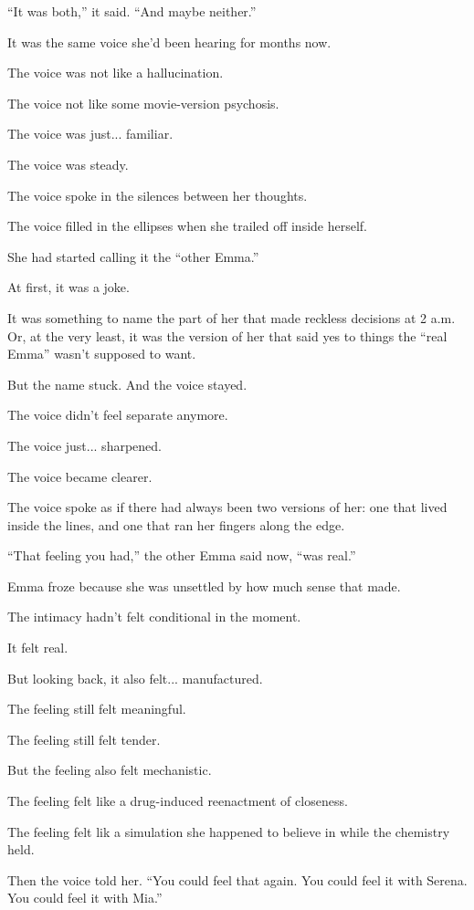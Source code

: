 ``It was both,'' it said. ``And maybe neither.''

It was the same voice she’d been hearing for months now.

The voice was not like a hallucination.

The voice not like some movie-version psychosis. 

The voice was just... familiar. 

The voice was steady. 

The voice spoke in the silences between her thoughts. 

The voice filled in the ellipses when she trailed off inside herself.

She had started calling it the ``other Emma.''

At first, it was a joke. 

It was something to name the part of her that made reckless decisions at 2 a.m.  
Or, at the very least, it was the version of her that said yes to things the ``real 
Emma'' wasn’t supposed to want.

But the name stuck. And the voice stayed. 

The voice didn’t feel separate anymore.  

The voice just... sharpened. 

The voice became clearer. 

The voice spoke as if there had always been two versions of her: one that lived inside the lines, 
and one that ran her fingers along the edge.

``That feeling you had,'' the other Emma said now, ``was real.''

Emma froze because she was unsettled by how much sense that made.

The intimacy hadn’t felt conditional in the moment. 

It felt real. 

But looking back, it also felt... manufactured. 

The feeling still felt meaningful.

The feeling still felt tender. 

But the feeling also felt mechanistic.

The feeling felt like a drug-induced reenactment of closeness. 

The feeling felt lik a simulation she happened to believe in while the chemistry held.

Then the voice told her. ``You could feel that again. You could feel it with Serena.  
You could feel it with Mia.''

